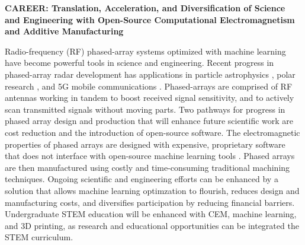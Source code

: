 \documentclass[../../main.tex]{subfiles}
\begin{document}
\textbf{CAREER: Translation, Acceleration, and Diversification of Science and Engineering with Open-Source Computational Electromagnetism and Additive Manufacturing} \\ \vspace{2.5mm}

Radio-frequency (RF) phased-array systems optimized with machine learning have become powerful tools in science and engineering.  Recent progress in phased-array radar development has applications in particle astrophysics \cite{Vieregg_2016,AVVA201746,electronics10040415,Aguilar_2021}, polar research \cite{arnold_2020,9670670}, and 5G mobile communications \cite{5G_review_paper}.  Phased-arrays are comprised of RF antennas working in tandem to boost received signal sensitivity, and to actively scan transmitted signals without moving parts.  Two pathways for progress in phased array design and production that will enhance future scientific work are cost reduction and the introduction of open-source software.  The electromagnetic properties of phased arrays are designed with expensive, proprietary software that does not interface with open-source machine learning tools \cite{10.3390/electronics8121506}.  Phased arrays are then manufactured using costly and time-consuming traditional machining techniques.  Ongoing scientific and engineering efforts can be enhanced by a solution that allows machine learning optimzation to flourish, reduces design and manufacturing costs, and diversifies participation by reducing financial barriers.  Undergraduate STEM education will be enhanced with CEM, machine learning, and 3D printing, as research and educational opportunities can be integrated the STEM curriculum.  \\ \vspace{2.5mm}
\end{document}
